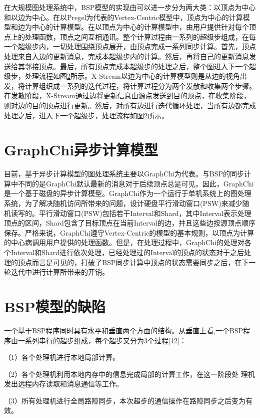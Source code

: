 在大规模图处理系统中，BSP模型的实现由可以进一步分为两大类：以顶点为中心和以边为中心。在以Pregel为代表的Vertex-Centric模型中，顶点为中心的计算模型和边为中心的计算模型。在以顶点为中心的计算模型中，由用户提供针对每个顶点上的处理函数，顶点之间互相通讯。整个计算过程由一系列的超级步组成，在每一个超级步内，一切处理围绕顶点展开，由顶点完成一系列同步计算。首先，顶点处理来自入边的更新消息，完成本超级步内的计算。然后，再将自己的更新消息发送给其邻接顶点。最后，所有顶点完成本超级步的处理之后，整个图进入下一个超级步，处理流程如图\ref{}所示。X-Stream以边为中心的计算模型则是从边的视角出发，将计算组织成一系列的迭代过程，将计算过程分为两个发散和收集两个步骤。在发散阶段，X-Stream通过边将更新信息由源点发送到目的顶点，在收集阶段，则对边的目的顶点进行更新。然后，对所有边进行迭代循环处理，当所有边都完成处理之后，进入下一个超级步，处理流程如图\ref{}所示。






\section{GraphChi异步计算模型}
目前，基于异步计算模型的图处理系统主要以GraphChi为代表。与BSP的同步计算中不同的是GraphChi默认最新的消息对于后续顶点总是可见。因此，GraphChi是一个基于磁盘的异步计算模型。GraphChi作为一个运行于单机系统上的图处理系统，为了解决随机访问所带来的问题，设计硬盘平行滑动窗口(PSW)来减少随机读写的。平行滑动窗口(PSW)包括若干Interval和Shard，其中Interval表示处理顶点的区间，Shard包含了目标顶点在当前Interval的边，并且这些边按源顶点顺序保存。严格来说，GraphChi遵守Vertex-Centric的模型的基本规则，以顶点为计算的中心病调用用户提供的处理函数。但是，在处理过程中，GraphChi的处理对各个Interval和Shard进行依次处理，已经处理过的Interval的顶点的状态对于之后处理的顶点而言是可见的，打破了BSP同步计算中顶点的状态需要同步之后，在下一轮迭代中进行计算所带来的开销。


\section{BSP模型的缺陷}

一个基于BSP程序同时具有水平和垂直两个方面的结构。从垂直上看,一个BSP程序由一系列串行的超步组成，每个超步又分为3个过程[12]：

（1）各个处理机进行本地局部计算。

（2）各个处理机利用本地内存中的信息完成局部的计算工作，在这一阶段处  理机发出远程内存读取和消息通信等工作。

（3）所有处理机进行全局路障同步，本次超步的通信操作在路障同步之后变为有效。


